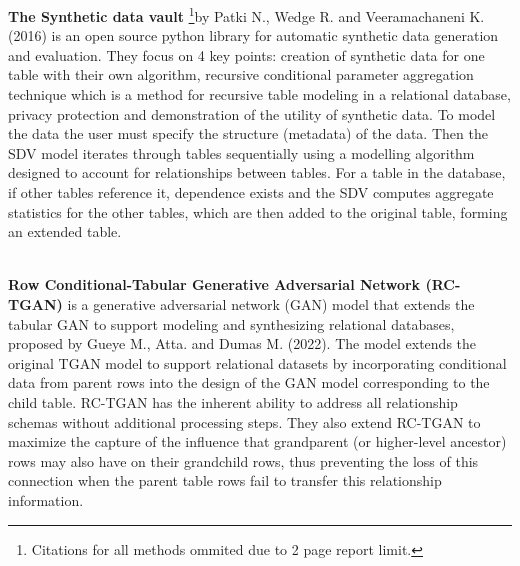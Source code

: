 \documentclass[fleqn,moreauthors,10pt]{ds_report}
\begin{document}
\textbf{The Synthetic data vault} \footnote{Citations for all methods ommited due to 2 page report limit.}by Patki N., Wedge R. and Veeramachaneni K. (2016) is an open source python library for automatic synthetic data generation and evaluation. They focus on 4 key points: creation of synthetic data for one table with their own algorithm, recursive conditional parameter aggregation technique which is a method for recursive table modeling in a relational database, privacy protection and demonstration of the utility of synthetic data. To model the data the user must specify the structure (metadata) of the data. Then the SDV model iterates through tables sequentially using a modelling algorithm designed to account for relationships between tables. For a table in the database, if other tables reference it, dependence exists and the SDV computes aggregate statistics for the other tables, which are then added to the original table, forming an extended table. 

\\

\textbf{Row Conditional-Tabular Generative Adversarial Network (RC-TGAN)} is a generative adversarial network (GAN) model that extends the tabular GAN to support modeling and synthesizing relational databases, proposed by Gueye M., Atta. and Dumas M. (2022). The model extends the original TGAN model to support relational datasets by incorporating conditional data from parent rows into the design of the GAN model corresponding to the child table. RC-TGAN has the inherent ability to address all relationship schemas without additional processing steps. They also extend RC-TGAN to maximize the capture of the influence that grandparent (or higher-level ancestor) rows may also have on their grandchild rows, thus preventing the loss of this connection when the parent table rows fail to transfer this relationship information. 

\end{document}
